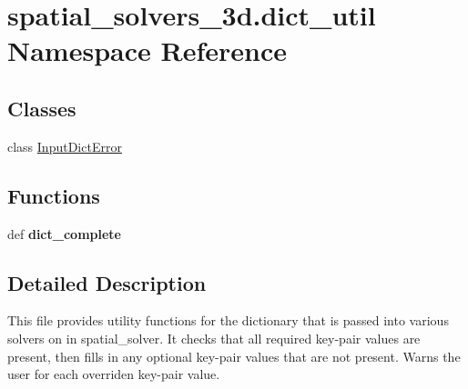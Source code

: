 \hypertarget{namespacespatial__solvers__3d_1_1dict__util}{\section{spatial\-\_\-solvers\-\_\-3d.\-dict\-\_\-util Namespace Reference}
\label{namespacespatial__solvers__3d_1_1dict__util}
}
\subsection*{Classes}
\begin{DoxyCompactItemize}
\item 
class \hyperlink{classspatial__solvers__3d_1_1dict__util_1_1_input_dict_error}{Input\-Dict\-Error}
\end{DoxyCompactItemize}
\subsection*{Functions}
\begin{DoxyCompactItemize}
\item 
\hypertarget{namespacespatial__solvers__3d_1_1dict__util_a516778afe95b5802406c43f47f0fd181}{def {\bfseries dict\-\_\-complete}}\label{namespacespatial__solvers__3d_1_1dict__util_a516778afe95b5802406c43f47f0fd181}

\end{DoxyCompactItemize}


\subsection{Detailed Description}
\begin{DoxyVerb}This file provides utility functions for the dictionary that is passed into various solvers on in spatial_solver.  It checks that all required key-pair values are present, then fills in any optional key-pair values that are not present.  Warns the user for each overriden key-pair value.\end{DoxyVerb}
 